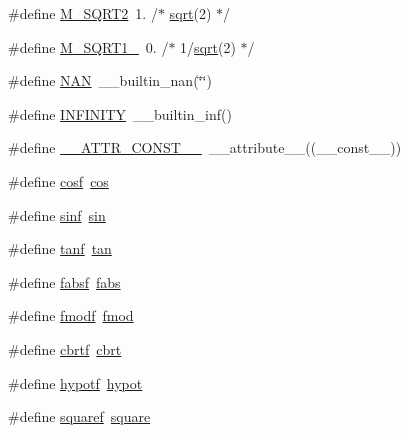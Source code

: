 \begin{DoxyCompactItemize}
\item 
\#define \hyperlink{group__avr__math_ga66b3ab30f1332874326ed93969e496e0}{M\+\_\+\+S\+Q\+R\+T2}~1.	/$\ast$ \hyperlink{group__avr__math_gaac21324d984f0af0fb87a613efb69d77}{sqrt}(2) $\ast$/
\item 
\#define \hyperlink{group__avr__math_gacdbb2c2f9429f08916f03c8786d2d2d7}{M\+\_\+\+S\+Q\+R\+T1\+\_}~0.	/$\ast$ 1/\hyperlink{group__avr__math_gaac21324d984f0af0fb87a613efb69d77}{sqrt}(2) $\ast$/
\item 
\#define \hyperlink{group__avr__math_ga8abfcc76130f3f991d124dd22d7e69bc}{N\+AN}~\+\_\+\+\_\+builtin\+\_\+nan(\char`\"{}\char`\"{})
\item 
\#define \hyperlink{group__avr__math_ga956e2723d559858d08644ac99146e910}{I\+N\+F\+I\+N\+I\+TY}~\+\_\+\+\_\+builtin\+\_\+inf()
\item 
\#define \hyperlink{group__avr__math_ga87f6b1b3880d945610873b9da382e5d4}{\+\_\+\+\_\+\+A\+T\+T\+R\+\_\+\+C\+O\+N\+S\+T\+\_\+\+\_\+}~\+\_\+\+\_\+attribute\+\_\+\+\_\+((\+\_\+\+\_\+const\+\_\+\+\_\+))
\item 
\#define \hyperlink{group__avr__math_gacc171f0e087ed26abd701c827944a43b}{cosf}~\hyperlink{group__avr__math_gaab93da039c516fcee9be6efb7d4cdfb3}{cos}
\item 
\#define \hyperlink{group__avr__math_ga6776b8d1a4149fe35e282a76effd8a9d}{sinf}~\hyperlink{group__avr__math_gaaf9cbe0a58b6fd6758e2d977aba46eb5}{sin}
\item 
\#define \hyperlink{group__avr__math_ga841e8ff746ff8b099a00ee83d2eed1d7}{tanf}~\hyperlink{group__avr__math_ga3aa121cf8eee9dc1647c0b83ebbd72e9}{tan}
\item 
\#define \hyperlink{group__avr__math_ga3745ca949b1ef9df47fb2f52c2536e68}{fabsf}~\hyperlink{group__avr__math_ga8045a0b219052cc0e90e74d07925f2b0}{fabs}
\item 
\#define \hyperlink{group__avr__math_ga7f41f3c7a21457008063af86e4eded3a}{fmodf}~\hyperlink{group__avr__math_gae20369249862b10d741eba7754bf733a}{fmod}
\item 
\#define \hyperlink{group__avr__math_gad724f06c46a6f4ad699fece14f219552}{cbrtf}~\hyperlink{group__avr__math_ga10e79401a84266cc52fed672a8bb4a41}{cbrt}
\item 
\#define \hyperlink{group__avr__math_gaae0bb7cd216d5b824d90da083e67021d}{hypotf}~\hyperlink{group__avr__math_gacb9c5b29c1ee2aed4d0f2d412a12f777}{hypot}
\item 
\#define \hyperlink{group__avr__math_gadd592f5a4371f7154f95df59a22f5bef}{squaref}~\hyperlink{group__avr__math_gabb95d8256ff81d58f092c065ea204293}{square}

\end{DoxyCompactItemize}
